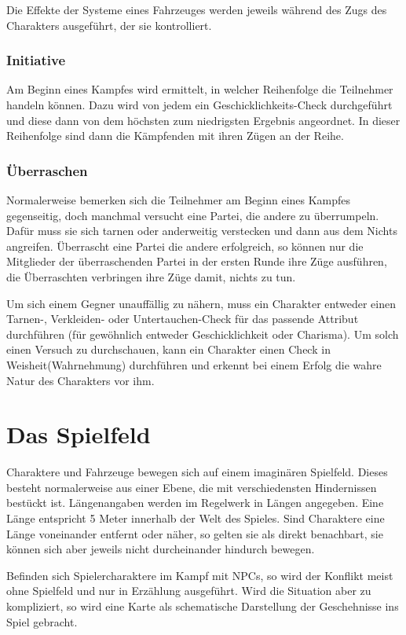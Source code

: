 Die Effekte der Systeme eines Fahrzeuges werden jeweils während des Zugs des Charakters ausgeführt, der sie kontrolliert.
\subsubsection{Initiative}
Am Beginn eines Kampfes wird ermittelt, in welcher Reihenfolge die Teilnehmer handeln können. Dazu wird von jedem ein Geschicklichkeits-Check durchgeführt und diese dann von dem höchsten zum niedrigsten Ergebnis angeordnet. In dieser Reihenfolge sind dann die Kämpfenden mit ihren Zügen an der Reihe.
\subsubsection{Überraschen}
Normalerweise bemerken sich die Teilnehmer am Beginn eines Kampfes gegenseitig, doch manchmal versucht eine Partei, die andere zu überrumpeln. Dafür muss sie sich tarnen oder anderweitig verstecken und dann aus dem Nichts angreifen. Überrascht eine Partei die andere erfolgreich, so können nur die Mitglieder der überraschenden Partei in der ersten Runde ihre Züge ausführen, die Überraschten verbringen ihre Züge damit, nichts zu tun.

Um sich einem Gegner unauffällig zu nähern, muss ein Charakter entweder einen Tarnen-, Verkleiden- oder Untertauchen-Check für das passende Attribut durchführen (für gewöhnlich entweder Geschicklichkeit oder Charisma). Um solch einen Versuch zu durchschauen, kann ein Charakter einen Check in Weisheit(Wahrnehmung) durchführen und erkennt bei einem Erfolg die wahre Natur des Charakters vor ihm.
\section{Das Spielfeld}
Charaktere und Fahrzeuge bewegen sich auf einem imaginären Spielfeld. Dieses besteht normalerweise aus einer Ebene, die mit verschiedensten Hindernissen bestückt ist.
Längenangaben werden im Regelwerk in \glqq Längen\grqq{} angegeben. Eine Länge entspricht 5 Meter innerhalb der Welt des Spieles. Sind Charaktere eine Länge voneinander entfernt oder näher, so gelten sie als direkt benachbart, sie können sich aber jeweils nicht durcheinander hindurch bewegen.

Befinden sich Spielercharaktere im Kampf mit NPCs, so wird der Konflikt meist ohne Spielfeld und nur in Erzählung ausgeführt. Wird die Situation aber zu kompliziert, so wird eine Karte als schematische Darstellung der Geschehnisse ins Spiel gebracht.

